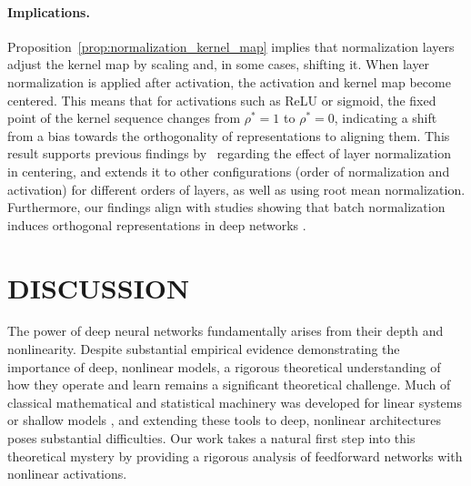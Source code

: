 \documentclass[twoside]{article}
\theoremstyle{definition}
\begin{document}

\paragraph{Implications.}
Proposition~\ref{prop:normalization_kernel_map} implies that normalization layers adjust the kernel map by scaling and, in some cases, shifting it. When layer normalization is applied after activation, the activation and kernel map become centered. This means that for activations such as ReLU or sigmoid, the fixed point of the kernel sequence changes from $\rho^*=1$ to $\rho^*=0$, indicating a shift from a bias towards the orthogonality of representations to aligning them. This result supports previous findings by~\citet{joudaki2023impact} regarding the effect of layer normalization in centering, and extends it to other configurations (order of normalization and activation) for different orders of layers, as well as using root mean normalization. Furthermore, our findings align with studies showing that batch normalization induces orthogonal representations in deep networks \citep{yang2019meanfield,daneshmand2021batch}.


\section{DISCUSSION}
The power of deep neural networks fundamentally arises from their depth and nonlinearity. Despite substantial empirical evidence demonstrating the importance of deep, nonlinear models, a rigorous theoretical understanding of how they operate and learn remains a significant theoretical challenge. Much of classical mathematical and statistical machinery was developed for linear systems or shallow models \citep{hastie2009elements}, and extending these tools to deep, nonlinear architectures poses substantial difficulties. Our work takes a natural first step into this theoretical mystery by providing a rigorous analysis of feedforward networks with nonlinear activations. 
\end{document}
